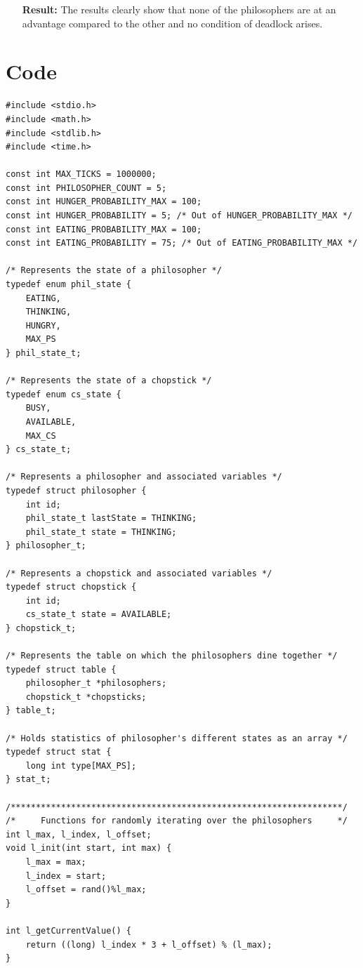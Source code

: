 \documentclass[a4,11pt]{article}
\begin{document}
\begin{enumerate}
\item[\textbf{\large\sffamily\color{blue}
    Result:}]{\large\sffamily\color{blue} The results clearly show
    that none of the philosophers are at an advantage compared to the
    other and no condition of deadlock arises.}
\end{enumerate}

\section{Code}
\begin{verbatim}
#include <stdio.h>
#include <math.h>
#include <stdlib.h>
#include <time.h>

const int MAX_TICKS = 1000000;
const int PHILOSOPHER_COUNT = 5;
const int HUNGER_PROBABILITY_MAX = 100;
const int HUNGER_PROBABILITY = 5; /* Out of HUNGER_PROBABILITY_MAX */
const int EATING_PROBABILITY_MAX = 100;
const int EATING_PROBABILITY = 75; /* Out of EATING_PROBABILITY_MAX */

/* Represents the state of a philosopher */
typedef enum phil_state {
    EATING,
    THINKING,
    HUNGRY,
    MAX_PS
} phil_state_t;

/* Represents the state of a chopstick */
typedef enum cs_state {
    BUSY,
    AVAILABLE,
    MAX_CS
} cs_state_t;

/* Represents a philosopher and associated variables */
typedef struct philosopher {
    int id;
    phil_state_t lastState = THINKING;
    phil_state_t state = THINKING;
} philosopher_t;

/* Represents a chopstick and associated variables */
typedef struct chopstick {
    int id;
    cs_state_t state = AVAILABLE;
} chopstick_t;

/* Represents the table on which the philosophers dine together */
typedef struct table {
    philosopher_t *philosophers;
    chopstick_t *chopsticks;
} table_t;

/* Holds statistics of philosopher's different states as an array */
typedef struct stat {
    long int type[MAX_PS];
} stat_t;

/******************************************************************/
/*     Functions for randomly iterating over the philosophers     */
int l_max, l_index, l_offset;
void l_init(int start, int max) {
    l_max = max;
    l_index = start;
    l_offset = rand()%l_max;
}

int l_getCurrentValue() {
    return ((long) l_index * 3 + l_offset) % (l_max);
}


\end{verbatim}
\end{document}
